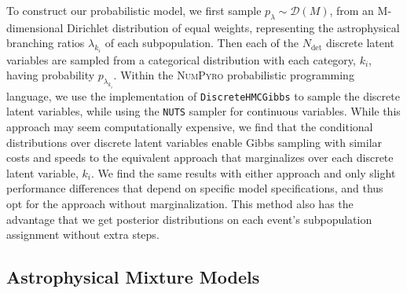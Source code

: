 \noindent To construct our probabilistic model, we first sample $p_{\lambda} \sim \mathcal{D}(M)$, from an M-dimensional Dirichlet distribution of equal weights, representing the astrophysical branching ratios $\lambda_{k_i}$ of each subpopulation. Then each of the $N_\mathrm{det}$ discrete latent variables are sampled from a categorical distribution with each category, $k_i$, having probability $p_{\lambda_{k_i}}$. Within the \textsc{NumPyro} \citep{1810.09538,1912.11554} probabilistic programming language, we use the implementation of \texttt{DiscreteHMCGibbs} \citep{Liu1996PeskunsTA} to sample the discrete latent variables, while using the \texttt{NUTS} \citep{1111.4246} sampler for continuous variables. While this approach may seem computationally expensive, we find that the conditional distributions over discrete latent variables enable Gibbs sampling with similar costs and speeds to the equivalent approach that marginalizes over each discrete latent variable, $k_i$. We find the same results with either approach and only slight performance differences that depend on specific model specifications, and thus opt for the approach without marginalization. This method also has the advantage that we get posterior distributions on each event's subpopulation assignment without extra steps.

\subsection{Astrophysical Mixture Models} \label{sec:astromodels} 

